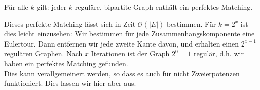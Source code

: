 \begin{satz}
    Für alle $k$ gilt: jeder $k$-reguläre, bipartite Graph enthält ein perfektes Matching.
\end{satz}
\bigskip

Dieses perfekte Matching lässt sich in Zeit $\mathcal{O}(|E|)$ bestimmen. Für $k=2^x$ ist dies leicht 
einzusehen: Wir bestimmen für jede Zusammenhangskomponente eine Eulertour. Dann entfernen wir jede 
zweite Kante davon, und erhalten einen $2^{x-1}$ regulären Graphen. Nach $x$ Iterationen ist der Graph
$2^0 = 1$ regulär, d.h. wir haben ein perfektes Matching gefunden. \\

Dies kann verallgemeinert werden, so dass es auch für nicht Zweierpotenzen funktioniert. Dies lassen 
wir hier aber aus.
